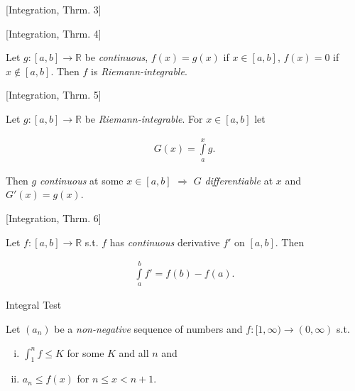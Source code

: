 \documentclass[10pt]{article} %
\renewcommand{\leq}{\leqslant}
\begin{document}
\begin{multicols}{3}
\begin{theorem}{[Integration, Thrm. 3]}{}
\end{theorem}

\begin{theorem}{[Integration, Thrm. 4]}{}

    Let $g: [a,b] \to \mathbb{R}$ be \emph{continuous}, $f(x) = g(x)$ if $x \in [a,b]$, $f(x) = 0$ if $x \not\in [a,b]$. Then $f$ is \emph{Riemann-integrable}.

\end{theorem}

\begin{theorem}{[Integration, Thrm. 5]}{}

    Let $g: [a,b] \to \mathbb{R}$ be \emph{Riemann-integrable}. For $x \in [a,b]$ let

        \begin{align*}
            G(x) = \int\limits_a^x g.
        \end{align*}

    Then $g$ \emph{continuous} at some $x \in [a,b]$ $\Rightarrow$ $G$ \emph{differentiable} at $x$ and $G'(x) = g(x)$.

\end{theorem}

\begin{theorem}{[Integration, Thrm. 6]}{}

    Let $f: [a,b] \to \mathbb{R}$ s.t. $f$ has \emph{continuous} derivative $f'$ on $[a,b]$. Then

        \begin{align*}
            \int\limits_a^b f' = f(b) - f(a).
        \end{align*}

\end{theorem}

\begin{exercise}{}{Integral Test}

    Let $(a_n)$ be a \emph{non-negative} sequence of numbers and $f: [1,\infty) \to (0,\infty)$ s.t.

        \begin{enumerate}[(i)]
            \setlength{\parskip}{0em}
            \item $\int_1^n f \leq K$ for some $K$ and all $n$ and
            \item $a_n \leq f(x)$ for $n \leq x < n+1$.
        \end{enumerate}


\end{exercise}
\end{multicols}
\end{document}
